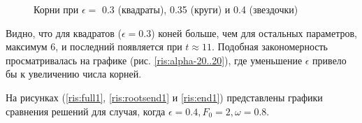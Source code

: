 \documentclass[%
bachelor,    %
natbib,      %
subf,        %
href,        %
colorlinks,  %
]{disser}
\begin{document}
\begin{figure}[h]
	\caption{Корни при $\epsilon = $ 0.3 (квадраты), 0.35 (круги) и 0.4 (звездочки) }
	\label{ris:roots2}
\end{figure}

Видно, что для квадратов ($\epsilon = 0.3$) коней больше, чем для остальных параметров, максимум 6, и последний появляется при $t \approx 11$. Подобная закономерность просматривалась на графике (рис. \ref{ris:alpha-20..20}), где уменьшение $\epsilon$ привело бы к увеличению числа корней.

На рисунках (\ref{ris:full1}, \ref{ris:rootsend1} и \ref{ris:end1}) представлены графики сравнения решений для случая, когда $\epsilon = 0.4, F_0 = 2, \omega = 0.8$.
\end{document}
